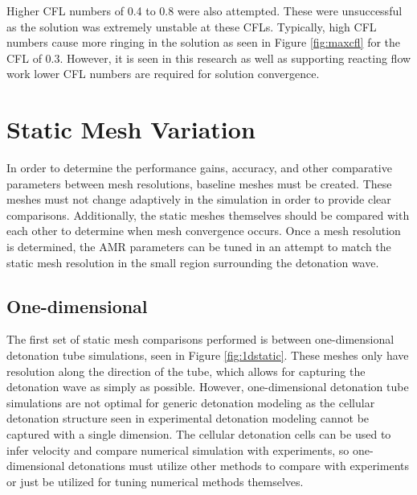 Higher CFL numbers of 0.4 to 0.8 were also attempted. These were unsuccessful as the solution was extremely unstable at these CFLs. Typically, high CFL numbers cause more ringing in the solution as seen in Figure \ref{fig:maxcfl} for the CFL of 0.3. However, it is seen in this research as well as supporting reacting flow work \cite{ajaero}\cite{kim}\cite{marcantoni} lower CFL numbers are required for solution convergence. 

\section{Static Mesh Variation}
\label{sec:staticvar}
In order to determine the performance gains, accuracy, and other comparative parameters between mesh resolutions, baseline meshes must be created. These meshes must not change adaptively in the simulation in order to provide clear comparisons. Additionally, the static meshes themselves should be compared with each other to determine when mesh convergence occurs. Once a mesh resolution is determined, the AMR parameters can be tuned in an attempt to match the static mesh resolution in the small region surrounding the detonation wave. 


\subsection{One-dimensional}
The first set of static mesh comparisons performed is between one-dimensional detonation tube simulations, seen in Figure \ref{fig:1dstatic}. These meshes only have resolution along the direction of the tube, which allows for capturing the detonation wave as simply as possible. However,  one-dimensional detonation tube simulations are not optimal for generic detonation modeling as the cellular detonation structure seen in experimental detonation modeling cannot be captured with a single dimension. The cellular detonation cells can be used to infer velocity and compare numerical simulation with experiments, so one-dimensional detonations must utilize other methods to compare with experiments or just be utilized for tuning numerical methods themselves. 

